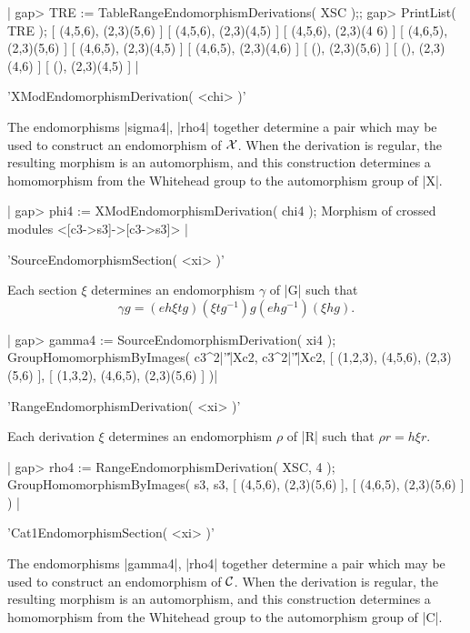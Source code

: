 {|    gap> TRE := TableRangeEndomorphismDerivations( XSC );;
    gap> PrintList( TRE );
    [ (4,5,6), (2,3)(5,6) ]
    [ (4,5,6), (2,3)(4,5) ]
    [ (4,5,6), (2,3)(4 6) ]
    [ (4,6,5), (2,3)(5,6) ]
    [ (4,6,5), (2,3)(4,5) ]
    [ (4,6,5), (2,3)(4,6) ]
    [ (), (2,3)(5,6) ]
    [ (), (2,3)(4,6) ]
    [ (), (2,3)(4,5) ]  |

%

'XModEndomorphismDerivation( <chi> )'

The endomorphisms  |sigma4|, |rho4|  together determine a pair
which may be used to construct an endomorphism of ${\cal X}$.
When the derivation is regular, the resulting morphism is an automorphism,
and this construction determines a homomorphism from the Whitehead group
to the automorphism group of |X|.

|    gap> phi4 := XModEndomorphismDerivation( chi4 );
    Morphism of crossed modules <[c3->s3]->[c3->s3]>  |

%

'SourceEndomorphismSection( <xi> )'

Each section $\xi$ determines an endomorphism  $\gamma$  of |G| such that  
$$\gamma g = (e h \xi t g)(\xi t g^{-1}) g (e h g^{-1}) (\xi h g).$$

|    gap> gamma4 := SourceEndomorphismDerivation( xi4 );
    GroupHomomorphismByImages( c3^2|'\|'|Xc2, c3^2|'\|'|Xc2,
      [ (1,2,3), (4,5,6), (2,3)(5,6) ], [ (1,3,2), (4,6,5), (2,3)(5,6) ] )|

%

'RangeEndomorphismDerivation( <xi> )'

Each derivation $\xi$ determines an endomorphism  $\rho$
of |R| such that  $\rho r = h \xi r$.

|    gap> rho4 := RangeEndomorphismDerivation( XSC, 4 );
    GroupHomomorphismByImages( s3, s3, [ (4,5,6), (2,3)(5,6) ], 
      [ (4,6,5), (2,3)(5,6) ] )   |

%

'Cat1EndomorphismSection( <xi> )'

The endomorphisms  |gamma4|, |rho4|  together determine a pair
which may be used to construct an endomorphism of ${\cal C}$.
When the derivation is regular, the resulting morphism is an automorphism,
and this construction determines a homomorphism from the Whitehead group
to the automorphism group of |C|.

}
